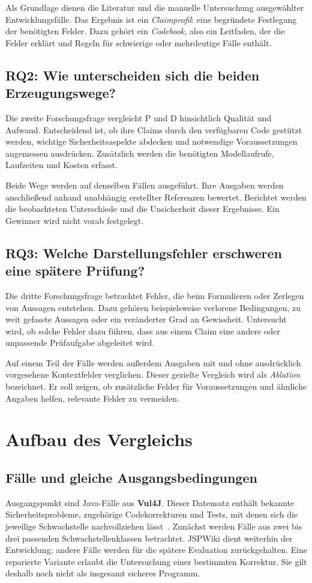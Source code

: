 \documentclass[10pt,a4paper]{article}
\begin{document}
Als Grundlage dienen die Literatur und die manuelle Untersuchung ausgewählter Entwicklungsfälle. Das Ergebnis ist ein \textit{Claimprofil}: eine begründete Festlegung der benötigten Felder. Dazu gehört ein \textit{Codebook}, also ein Leitfaden, der die Felder erklärt und Regeln für schwierige oder mehrdeutige Fälle enthält.

\subsection{RQ2: Wie unterscheiden sich die beiden Erzeugungswege?}
Die zweite Forschungsfrage vergleicht P und D hinsichtlich Qualität und Aufwand. Entscheidend ist, ob ihre Claims durch den verfügbaren Code gestützt werden, wichtige Sicherheitsaspekte abdecken und notwendige Voraussetzungen angemessen ausdrücken. Zusätzlich werden die benötigten Modellaufrufe, Laufzeiten und Kosten erfasst.

Beide Wege werden auf denselben Fällen ausgeführt. Ihre Ausgaben werden anschlie\ss{}end anhand unabhängig erstellter Referenzen bewertet. Berichtet werden die beobachteten Unterschiede und die Unsicherheit dieser Ergebnisse. Ein Gewinner wird nicht vorab festgelegt.

\subsection{RQ3: Welche Darstellungsfehler erschweren eine spätere Prüfung?}
Die dritte Forschungsfrage betrachtet Fehler, die beim Formulieren oder Zerlegen von Aussagen entstehen. Dazu gehören beispielsweise verlorene Bedingungen, zu weit gefasste Aussagen oder ein veränderter Grad an Gewissheit. Untersucht wird, ob solche Fehler dazu führen, dass aus einem Claim eine andere oder unpassende Prüfaufgabe abgeleitet wird.

Auf einem Teil der Fälle werden au\ss{}erdem Ausgaben mit und ohne ausdrücklich vorgesehene Kontextfelder verglichen. Dieser gezielte Vergleich wird als \textit{Ablation} bezeichnet. Er soll zeigen, ob zusätzliche Felder für Voraussetzungen und ähnliche Angaben helfen, relevante Fehler zu vermeiden.

\section{Aufbau des Vergleichs}
\subsection{Fälle und gleiche Ausgangsbedingungen}
Ausgangspunkt sind Java-Fälle aus \textbf{Vul4J}. Dieser Datensatz enthält bekannte Sicherheitsprobleme, zugehörige Codekorrekturen und Tests, mit denen sich die jeweilige Schwachstelle nachvollziehen lässt~\cite{vul4j}. Zunächst werden Fälle aus zwei bis drei passenden Schwachstellenklassen betrachtet. JSPWiki dient weiterhin der Entwicklung; andere Fälle werden für die spätere Evaluation zurückgehalten. Eine reparierte Variante erlaubt die Untersuchung einer bestimmten Korrektur. Sie gilt deshalb noch nicht als insgesamt sicheres Programm.
\end{document}
